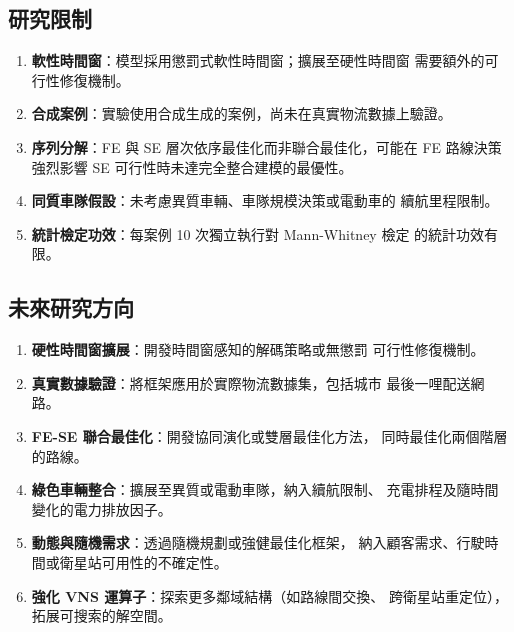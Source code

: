 \documentclass[11pt, a4paper]{article}
\numberwithin{equation}{section}
\begin{document}
\subsection{研究限制}

\begin{enumerate}
  \item \textbf{軟性時間窗}：模型採用懲罰式軟性時間窗；擴展至硬性時間窗
        需要額外的可行性修復機制。
  \item \textbf{合成案例}：實驗使用合成生成的案例，尚未在真實物流數據上驗證。
  \item \textbf{序列分解}：FE 與 SE 層次依序最佳化而非聯合最佳化，可能在
        FE 路線決策強烈影響 SE 可行性時未達完全整合建模的最優性。
  \item \textbf{同質車隊假設}：未考慮異質車輛、車隊規模決策或電動車的
        續航里程限制。
  \item \textbf{統計檢定功效}：每案例 10 次獨立執行對 Mann-Whitney 檢定
        的統計功效有限。
\end{enumerate}

\subsection{未來研究方向}

\begin{enumerate}
  \item \textbf{硬性時間窗擴展}：開發時間窗感知的解碼策略或無懲罰
        可行性修復機制。
  \item \textbf{真實數據驗證}：將框架應用於實際物流數據集，包括城市
        最後一哩配送網路。
  \item \textbf{FE-SE 聯合最佳化}：開發協同演化或雙層最佳化方法，
        同時最佳化兩個階層的路線。
  \item \textbf{綠色車輛整合}：擴展至異質或電動車隊，納入續航限制、
        充電排程及隨時間變化的電力排放因子。
  \item \textbf{動態與隨機需求}：透過隨機規劃或強健最佳化框架，
        納入顧客需求、行駛時間或衛星站可用性的不確定性。
  \item \textbf{強化 VNS 運算子}：探索更多鄰域結構（如路線間交換、
        跨衛星站重定位），拓展可搜索的解空間。
\end{enumerate}

\printbibliography
\end{document}
